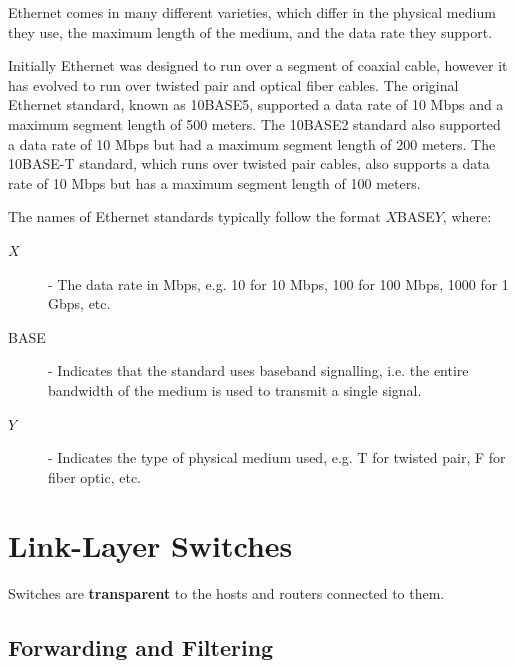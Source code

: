 \documentclass[12pt letter]{report}
\begin{document}

Ethernet comes in many different varieties, which differ in the
physical medium they use, the maximum length of the medium, and the
data rate they support.

Initially Ethernet was designed to run over a segment of coaxial
cable, however it has evolved to run over twisted pair and optical
fiber cables. The original Ethernet standard, known as 10BASE5,
supported a data rate of 10 Mbps and a maximum segment length of 500
meters. The 10BASE2 standard also supported a data rate of 10 Mbps
but had a maximum segment length of 200 meters. The 10BASE-T
standard, which runs over twisted pair cables, also supports a data
rate of 10 Mbps but has a maximum segment length of 100 meters.

The names of Ethernet standards typically follow the format $X$BASE$Y$, where:
\begin{description}
  \item[$X$] - The data rate in Mbps, e.g. 10 for 10 Mbps, 100 for 100
    Mbps, 1000 for 1 Gbps, etc.
  \item[BASE] - Indicates that the standard uses baseband signalling, i.e.
    the entire bandwidth of the medium is used to transmit a single signal.
  \item[$Y$] - Indicates the type of physical medium used, e.g.
    T for twisted pair, F for fiber optic, etc.
\end{description}

\section{Link-Layer Switches}



Switches are \textbf{transparent} to the hosts and routers connected to them.

\subsection{Forwarding and Filtering}
\end{document}
